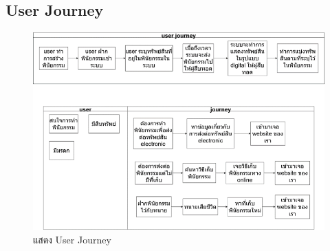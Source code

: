 \documentclass[12pt,oneside,openright,a4paper]{cpe-thai-project}
\begin{document}
\subsection{User Journey}
	\begin{figure}[h]
		\centering
		\includegraphics[scale=0.8]{UserJourney}
		\caption{แสดง User Journey}
	\end{figure}
\FloatBarrier
\hfill\\
\hfill\\
\hfill\\
\end{document}
